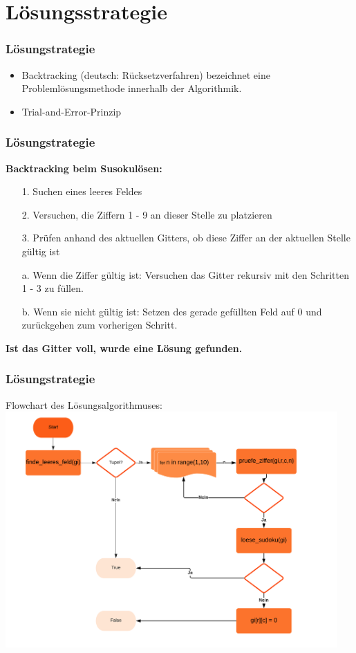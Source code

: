 \documentclass{beamer}
\begin{document}
\section{Lösungsstrategie}
\begin{frame}
	\frametitle{Lösungstrategie} 
	\begin{itemize}
		\item Backtracking (deutsch: Rücksetzverfahren) bezeichnet eine Problemlösungsmethode innerhalb der Algorithmik. 
		\item Trial-and-Error-Prinzip
	\end{itemize}
\end{frame}

\begin{frame}
	\frametitle{Lösungstrategie} 

	\textbf{Backtracking beim Susokulösen:}
	
	\begin{itemize}
		\item [1.] Suchen eines leeres Feldes
\item [2.] Versuchen, die Ziffern 1 - 9 an dieser Stelle zu platzieren
	\item [3.] Prüfen anhand des aktuellen Gitters, ob diese Ziffer an der aktuellen Stelle gültig ist
	\item [a.] Wenn die Ziffer gültig ist: Versuchen das Gitter rekursiv mit den Schritten 1 - 3 zu füllen.
	\item [b.] Wenn sie nicht gültig ist: Setzen des gerade gefüllten Feld auf 0 und zurückgehen zum vorherigen Schritt.
	\end{itemize}
	\textbf{Ist das Gitter voll, wurde eine Lösung gefunden.}
\end{frame}

\begin{frame}
	\frametitle{Lösungstrategie} 
	Flowchart des Lösungsalgorithmuses:
		\centering
	\includegraphics[width=0.95\textwidth]{img/flow.png}
\end{frame}
\end{document}
